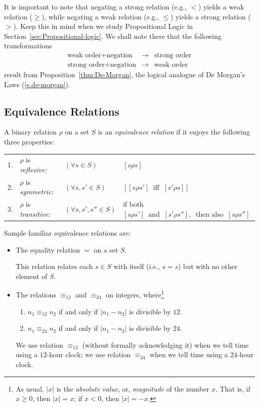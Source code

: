 \medskip

It is important to note that negating a strong relation (e.g., $<$)
yields a weak relation ($\geq$), while negating a weak relation (e.g.,
$\leq$) yields a strong relation ($>$).  Keep this in mind when we
study Propositional Logic in Section~\ref{sec:Propositional-logic}.
We shall note there that the following transformations
\begin{eqnarray*}
\mbox{weak order} + \mbox{negation} 
 & \longrightarrow & \mbox{strong order} \\
\mbox{strong order} + \mbox{negation}
 & \longrightarrow & \mbox{weak order}
\end{eqnarray*}
result from Proposition~\ref{thm:De-Morgan}, the logical analogue of
De Morgan's Laws (\ref{e.de-morgan}).

\subsection{Equivalence Relations}
\label{sec:equiv-relation}

A binary relation $\rho$ on a set $S$ is an {\it equivalence relation}
  
if it enjoys the following three properties:

\medskip

\begin{tabular}{llll}
1. &
$\rho$ is {\em reflexive:}
   & $(\forall s \in S)$ & $[s \rho s]$ \\
2. &
$\rho$ is {\em symmetric:}
   & $(\forall s, s' \in S)$ 
& $\left[ [s \rho s'] \ \mbox{ iff } \ [s' \rho s] \right]$ \\
3. &
$\rho$ is {\em transitive:}
   & $(\forall s, s', s'' \in S)$ & if both \
$[s \rho s'] \ \mbox{ and } \ [s' \rho s''], \ \mbox{ then also } \ [s \rho s'']$
\end{tabular}

\medskip

\noindent
Sample familiar  equivalence relations are:
\begin{itemize}
\item
The equality relation $=$ on a set $S$.

This relation relates each $s \in S$ with itself (i.e., $s=s$) but
with no other element of $S$.

\item
The relations $\equiv_{12}$ and $\equiv_{24}$ on integers,
where\footnote{As usual, $|x|$ is the {\em absolute value}, or, {\em
    magnitude} of the number $x$.  That is, if $x \geq 0$, then $|x| =
  x$; if $x < 0$, then $|x| = -x$.}
  \begin{enumerate}
  \item
$n_1 \equiv_{12} n_2$ if and only if $|n_1 - n_2|$ is divisible by
$12$.
  \item
$n_1 \equiv_{24} n_2$ if and only if $|n_1 - n_2|$ is divisible by
$24$.
  \end{enumerate}
We use relation $\equiv_{12}$ (without formally acknowledging it) when
we tell time using a $12$-hour clock; we use relation $\equiv_{24}$
when we tell time using a $24$-hour clock.
\end{itemize}

